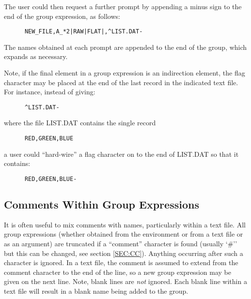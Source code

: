 The user could then request a further prompt by appending a minus sign to the
end of the group expression, as follows:

\small
\begin{verbatim}
      NEW_FILE,A_*2|RAW|FLAT|,^LIST.DAT-
\end{verbatim}
\normalsize

The names obtained at each prompt are appended to the end of the group, which
expands as necessary.

Note, if the final element in a group expression is an indirection element, the
flag character may be placed at the end of the last record in the indicated text
file. For instance, instead of giving:

\small
\begin{verbatim}
      ^LIST.DAT-
\end{verbatim}
\normalsize

where the file LIST.DAT contains the single record

\small
\begin{verbatim}
      RED,GREEN,BLUE
\end{verbatim}
\normalsize

a user could ``hard-wire'' a flag character on to the end of LIST.DAT so that
it contains:

\small
\begin{verbatim}
      RED,GREEN,BLUE-
\end{verbatim}
\normalsize

\subsection{Comments Within Group Expressions}
It is often useful to mix comments with names, particularly within a text file.
All group expressions (whether obtained from the environment or from a text
file or as an argument) are truncated if a ``comment'' character is found (usually `\#'' but this
can be changed, see section \ref{SEC:CC}). Anything occurring after such a
character is ignored. In a text file, the comment is assumed to extend from the
comment character to the end of the line, so a new group expression may be
given on the next line. Note, blank lines are {\em not} ignored. Each blank line
within a text file will result in a blank name being added to the group.

